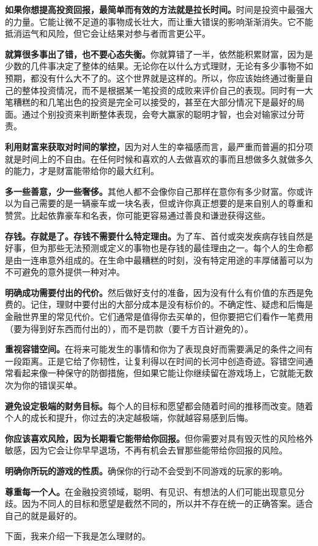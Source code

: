\textbf{如果你想提高投资回报，最简单而有效的方法就是拉长时间。}时间是投资中最强大的力量。它能让微不足道的事物成长壮大，而让重大错误的影响渐渐消失。它不能抵消运气和风险，但它会让结果对参与者而言更公平。

\textbf{就算很多事出了错，也不要心态失衡。}你就算错了一半，依然能积累财富，因为是少数的几件事决定了整体的结果。无论你在以什么方式理财，无论有多少事物不如预期，都没有什么大不了的。这个世界就是这样的。所以，你应该始终通过衡量自己的整体投资情况，而不是根据某一笔投资的成败来评价自己的表现。同时有一大笔糟糕的和几笔出色的投资是完全可以接受的，甚至在大部分情况下是最好的局面。通过个别投资来判断整体表现，会夸大赢家的聪明才智，也会对输家过分苛责。

\textbf{利用财富来获取对时间的掌控，}因为对人生的幸福感而言，最严重而普遍的扣分项就是时间上的不自由。在任何时候和喜欢的人去做喜欢的事而且想做多久就做多久的能力，才是财富能带给你的最大红利。

\textbf{多一些善意，少一些奢侈。}其他人都不会像你自己那样在意你有多少财富。你或许以为自己需要的是一辆豪车或一块名表，但或许你真正想要的是来自别人的尊重和赞赏。比起依靠豪车和名表，你可能更容易通过善良和谦逊获得这些。

\textbf{存钱。存就是了。存钱不需要什么特定理由。}为了车、首付或突发疾病存钱自然是好事，但为那些无法预测或定义的事物也是存钱的最佳理由之一。每个人的生命都是由一连串意外组成的。在生命中最糟糕的时刻，没有特定用途的丰厚储蓄可以为不可避免的意外提供一种对冲。

\textbf{明确成功需要付出的代价。}然后做好支付的准备，因为没有什么有价值的东西是免费的。记住，理财中要付出的大部分成本是没有标价的。不确定性、疑虑和后悔是金融世界里的常见代价。它们通常是值得你去买单的，但你要把它们看作一笔费用（要为得到好东西而付出的），而不是罚款（要千方百计避免的）。

\textbf{重视容错空间。}在将来可能发生的事情和你为了表现良好而需要满足的条件之间有一段距离。正是它给了你韧性，让复利得以在时间的长河中创造奇迹。容错空间通常看起来像一种保守的防御措施，但如果它能让你继续留在游戏场上，它就能无数次为你的错误买单。

\textbf{避免设定极端的财务目标。}每个人的目标和愿望都会随着时间的推移而改变。随着个人的成长和提升，你过去的决定越极端，你就越容易感到后悔。

\textbf{你应该喜欢风险，因为长期看它能带给你回报。}但你需要对具有毁灭性的风险格外敏感，因为它会让你早早退场，不再有机会去冒那些能带给你回报的风险。

\textbf{明确你所玩的游戏的性质。}确保你的行动不会受到不同游戏的玩家的影响。

\textbf{尊重每一个人。}在金融投资领域，聪明、有见识、有想法的人们可能出现意见分歧。因为不同人的目标和愿望是截然不同的，所以并不存在统一的正确答案。适合自己的就是最好的。

下面，我来介绍一下我是怎么理财的。

